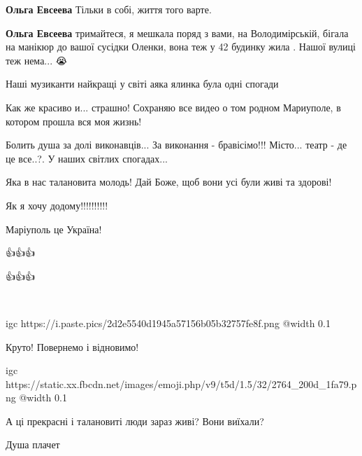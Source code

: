\begin{itemize} %
\textbf{Ольга Евсеева} Тільки в собі, життя того варте.

\textbf{Ольга Евсеева} тримайтеся, я мешкала поряд з вами, на Володимірській, бігала на манікюр до вашої сусідки Оленки, вона теж у 42 будинку жила . Нашої вулиці теж нема... 😭
\end{itemize} %


Наші музиканти найкращі у світі аяка ялинка була одні спогади


Как же красиво и... страшно! Сохраняю все видео о том родном Мариуполе, в
котором прошла вся моя жизнь!


Болить душа за долі виконавців... За виконання - бравісімо!!! Місто... театр -
де це все..?. У наших світлих спогадах...


Яка в нас талановита молодь! Дай Боже, щоб вони усі були живі та здорові!

Як я хочу додому!!!!!!!!!!

Маріуполь це Україна!


👍👍👍


👍👍👍


💙💛


\ifcmt
  igc https://i.paste.pics/2d2e5540d1945a57156b05b32757fe8f.png
	@width 0.1
\fi


Круто! Повернемо і відновимо!


\ifcmt
  igc https://static.xx.fbcdn.net/images/emoji.php/v9/t5d/1.5/32/2764_200d_1fa79.png
	@width 0.1
\fi


А ці прекрасні і талановиті люди зараз живі? Вони виїхали?


Душа плачет


